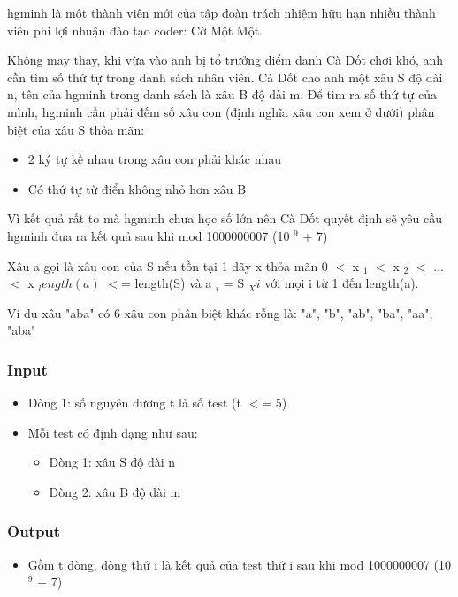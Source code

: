 



   hgminh là một thành viên mới của tập đoàn trách nhiệm hữu hạn nhiều thành viên phi lợi nhuận đào tạo coder: Cờ Một Một.  

   Không may thay, khi vừa vào anh bị tổ trưởng điểm danh Cà Dốt chơi khó, anh cần tìm số thứ tự trong danh sách nhân viên. Cà Dốt cho anh một xâu S độ dài n, tên của hgminh trong danh sách là xâu B độ dài m. Để tìm ra số thứ tự của mình, hgminh cần phải đếm số xâu con (định nghĩa xâu con xem ở dưới) phân biệt của xâu S thỏa mãn:  
\begin{itemize}
	\item     2 ký tự kề nhau trong xâu con phải khác nhau   
	\item     Có thứ tự từ điển không nhỏ hơn xâu B   
\end{itemize}

   Vì kết quả rất to mà hgminh chưa học số lớn nên Cà Dốt quyết định sẽ yêu cầu hgminh đưa ra kết quả sau khi mod 1000000007 (10   $^    9   $   + 7)  



   Xâu a gọi là xâu con của S nếu tồn tại 1 dãy x thỏa mãn 0 $<$ x   $_    1   $   $<$ x   $_    2   $   $<$ ...$<$ x   $_    length(a)   $   $<$= length(S) và a   $_    i   $   = S   $_    Xi   $   với mọi i từ 1 đến length(a).  

   Ví dụ xâu "aba" có 6 xâu con phân biệt khác rỗng là: "a", "b", "ab", "ba", "aa", "aba"  



\subsubsection{   Input  }
\begin{itemize}
	\item     Dòng 1: số nguyên dương t là số test (t $<$= 5)   
	\item     Mỗi test có định dạng như sau:    
\begin{itemize}
	\item       Dòng 1: xâu S độ dài n     
	\item       Dòng 2: xâu B độ dài m     
\end{itemize}
\end{itemize}

\subsubsection{   Output  }
\begin{itemize}
	\item     Gồm t dòng, dòng thứ i là kết quả của test thứ i sau khi mod 1000000007 (10    $^     9    $    + 7)   
\end{itemize}



